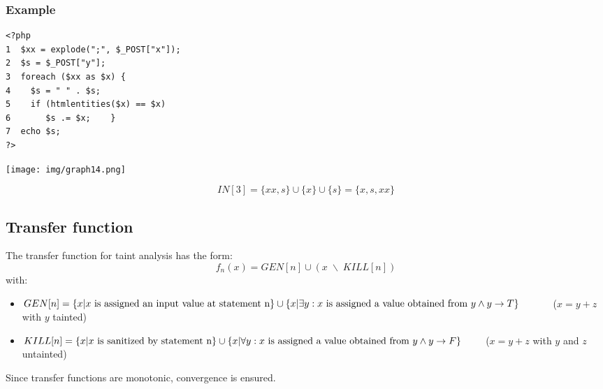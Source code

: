 \documentclass[a4paper, 10pt, titlepage]{article}
\begin{document}
\subsubsection*{Example}
\begin{minipage}{0.5\textwidth}
\begin{small}
\begin{lstlisting}
<?php 
1  $xx = explode(";", $_POST["x"]); 
2  $s = $_POST["y"]; 
3  foreach ($xx as $x) { 
4    $s = " " . $s; 
5    if (htmlentities($x) == $x) 
6       $s .= $x;    } 
7  echo $s; 
?>
\end{lstlisting}
\end{small}
\end{minipage}
\hfill\vline\hfill
\begin{minipage}{0.4\textwidth}
\begin{center}
\texttt{[image: img/graph14.png]}
\end{center}
\begin{small}
$$IN[3] = \{xx, s\} \cup \{x\} \cup \{s\} = \{x, s, xx\}$$
\end{small}
\end{minipage}

\subsection{Transfer function}
The transfer function for taint analysis has the form: 
$$f_n(x) = GEN[n] \cup (x \; \backslash \; KILL[n])$$
with:
\begin{itemize}
\item $GEN[n] = \{x | x \text{ is assigned an input value at statement n} \} \cup \\\{x | \exists y: x \text{ is assigned a value obtained from } y \wedge y \rightarrow T\}\quad\quad\quad$ ($x=y+z$ with $y$ tainted)
\item $KILL[n] = \{x | x \text{ is sanitized by statement n} \} \cup \\\{x | \forall y: x \text{ is assigned a value obtained from } y \wedge y \rightarrow F\}\quad\quad$ ($x=y+z$ with $y$ and $z$ untainted)
\end{itemize}
Since transfer functions are monotonic, convergence is ensured.
\end{document}
